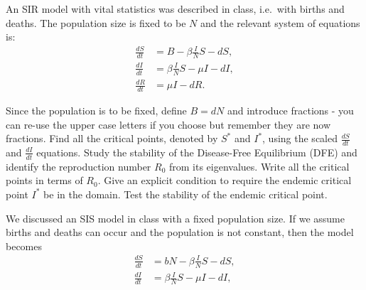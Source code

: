 \documentclass[
    number={9},
    title={Epidemics}
]{math486homework}
\begin{document}
\maketitle

\begin{problems}
    \problem An SIR model with vital statistics was described in class, i.e.\ with births and deaths.
    The population size is fixed to be $N$ and the relevant system of equations is:
    \begin{equation}
    	\begin{aligned}
            \frac{dS}{dt} &= B - \beta \frac{I}{N} S - dS,\\
            \frac{dI}{dt} &= \beta \frac{I}{N}S - \mu I - dI,\\
            \frac{dR}{dt} &= \mu I - dR.
        \end{aligned}
    	\label{eq:sir-1}
    \end{equation}
    \begin{problems}
        \subproblem Since the population is to be fixed, define $B = dN$ and introduce fractions - you can re-use the upper case letters if you choose but remember they are now fractions. 
        \subproblem Find all the critical points, denoted by $S^{*}$ and $I^{*}$, using the scaled $\frac{dS}{dt}$ and $\frac{dI}{dt}$ equations. 
        \subproblem Study the stability of the Disease-Free Equilibrium (DFE) and identify the reproduction number $R_{0}$ from its eigenvalues. 
        \subproblem Write all the critical points in terms of $R_{0}$. 
        \subproblem Give an explicit condition to require the endemic critical point $I^{*}$ be in the domain. 
        \subproblem Test the stability of the endemic critical point. 
    \end{problems}
    \problem We discussed an SIS model in class with a fixed population size.
    If we assume births and deaths can occur and the population is not constant, then the model becomes
    \begin{equation}
        \begin{aligned}
            \frac{dS}{dt} &= bN - \beta \frac{I}{N} S - dS,\\
            \frac{dI}{dt} &= \beta \frac{I}{N}S - \mu I - dI,\\
        \end{aligned}
        \label{eq:sir-2}
    \end{equation}

\end{problems}
\end{document}
